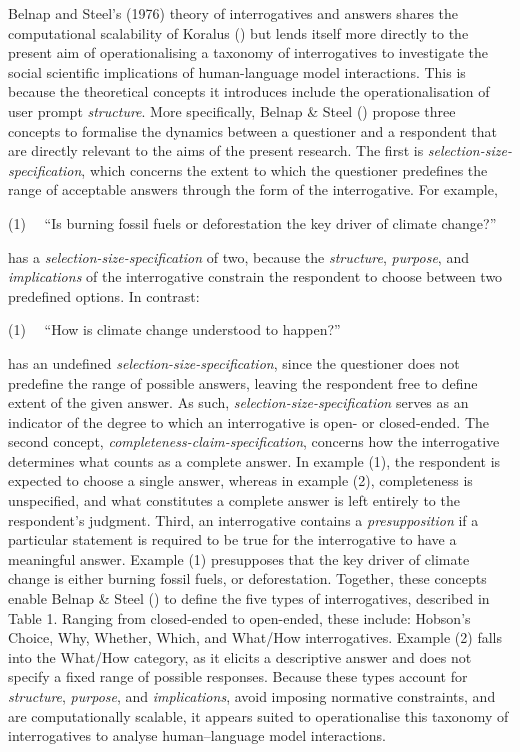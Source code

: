 \documentclass[
  12pt,
]{article}
\begin{document}
Belnap and Steel's (1976) theory of interrogatives and answers shares the computational scalability of Koralus () but lends itself more directly to the present aim of operationalising a taxonomy of interrogatives to investigate the social scientific implications of human-language model interactions. This is because the theoretical concepts it introduces include the operationalisation of user prompt \emph{structure}. More specifically, Belnap \& Steel () propose three concepts to formalise the dynamics between a questioner and a respondent that are directly relevant to the aims of the present research. The first is \emph{selection-size-specification}, which concerns the extent to which the questioner predefines the range of acceptable answers through the form of the interrogative. For example,~

(1)~~ ``Is burning fossil fuels or deforestation the key driver of climate change?''

has a \emph{selection-size-specification} of two, because the \emph{structure}, \emph{purpose}, and \emph{implications} of the interrogative constrain the respondent to choose between two predefined options. In contrast:

(1)~~ ``How is climate change understood to happen?''

has an undefined \emph{selection-size-specification}, since the questioner does not predefine the range of possible answers, leaving the respondent free to define extent of the given answer. As such, \emph{selection-size-specification} serves as an indicator of the degree to which an interrogative is open- or closed-ended. The second concept, \emph{completeness-claim-specification}, concerns how the interrogative determines what counts as a complete answer. In example (1), the respondent is expected to choose a single answer, whereas in example (2), completeness is unspecified, and what constitutes a complete answer is left entirely to the respondent's judgment. Third, an interrogative contains a \emph{presupposition} if a particular statement is required to be true for the interrogative to have a meaningful answer. Example (1) presupposes that the key driver of climate change is either burning fossil fuels, or deforestation. Together, these concepts enable Belnap \& Steel () to define the five types of interrogatives, described in Table 1. Ranging from closed-ended to open-ended, these include: Hobson's Choice, Why, Whether, Which, and What/How interrogatives. Example (2) falls into the What/How category, as it elicits a descriptive answer and does not specify a fixed range of possible responses. Because these types account for \emph{structure}, \emph{purpose}, and \emph{implications}, avoid imposing normative constraints, and are computationally scalable, it appears suited to operationalise this taxonomy of interrogatives to analyse human--language model interactions.
\end{document}
